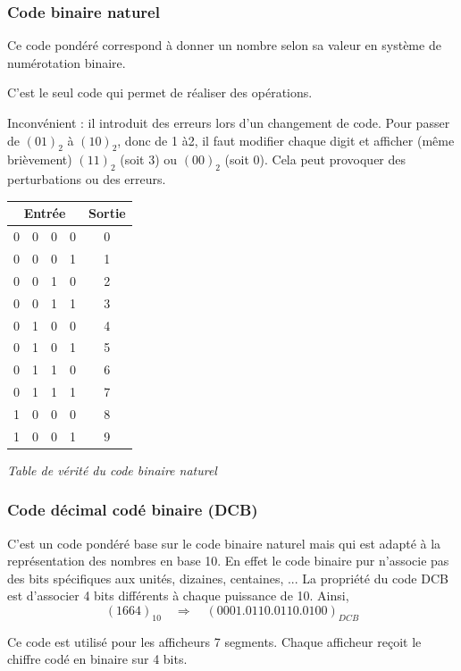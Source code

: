 \documentclass[11pt,oneside]{article}
\begin{document}
\subsubsection{Code binaire naturel}
Ce code pondéré correspond à donner un nombre selon sa valeur en système de numérotation binaire. 

C'est le seul code qui permet de réaliser des opérations. 

Inconvénient : il introduit des erreurs lors d'un changement de code. Pour passer de $(01)_2$ à $(10)_2$, donc de 1 à2, il faut modifier chaque digit et afficher (même brièvement) $(11)_2$ (soit 3) ou $(00)_2$ (soit 0). Cela peut provoquer des perturbations ou des erreurs. 

\begin{center}
\begin{tabular}{|c|c|c|c||c|}
\hline
\multicolumn{4}{|c|}{Entrée} & Sortie \\ \hline \hline
0 & 0 & 0 & 0 & 0 \\ \hline 
0 & 0 & 0 & 1 & 1 \\ \hline
0 & 0 & 1 & 0 & 2 \\ \hline
0 & 0 & 1 & 1 & 3 \\ \hline
0 & 1 & 0 & 0 & 4 \\ \hline
0 & 1 & 0 & 1 & 5 \\ \hline
0 & 1 & 1 & 0 & 6 \\ \hline
0 & 1 & 1 & 1 & 7 \\ \hline
1 & 0 & 0 & 0 & 8 \\ \hline
1 & 0 & 0 & 1 & 9 \\ \hline
\end{tabular}

\textit{Table de vérité du code binaire naturel}
\end{center} 


\subsubsection{Code décimal codé binaire (DCB)}
C'est un code pondéré base sur le code binaire naturel mais qui est adapté à la représentation des nombres en base 10. En effet le code binaire pur n'associe pas des bits spécifiques aux unités, dizaines, centaines, ... La propriété du code DCB est d'associer 4 bits différents à chaque puissance de 10. Ainsi, 
$$
(1664)_{10} \quad \Longrightarrow \quad  (0001.0110.0110.0100)_{DCB}
$$

Ce code est utilisé pour les afficheurs 7 segments. Chaque afficheur reçoit le chiffre codé en binaire sur 4 bits. 
\end{document}
